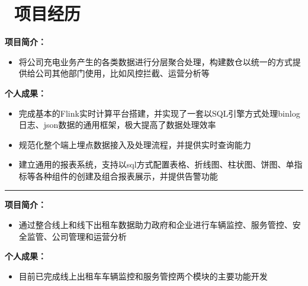 \documentclass{resume}
\begin{document}
\section{\faUsers\ 项目经历}
\textbf{项目简介：}
\begin{itemize}
  \item 将公司充电业务产生的各类数据进行分层聚合处理，构建数仓以统一的方式提供给公司其他部门使用，比如风控拦截、运营分析等
\end{itemize}
\textbf{个人成果：}
\begin{itemize}
  \item 完成基本的Flink实时计算平台搭建，并实现了一套以SQL引擎方式处理binlog日志、json数据的通用框架，极大提高了数据处理效率
  \item 规范化整个端上埋点数据接入及处理流程，并提供实时查询能力
  \item 建立通用的报表系统，支持以sql方式配置表格、折线图、柱状图、饼图、单指标等各种组件的创建及组合报表展示，并提供告警功能
\end{itemize}

\rule{\textwidth}{0.1mm}
\textbf{项目简介：}
\begin{itemize}
  \item 通过整合线上和线下出租车数据助力政府和企业进行车辆监控、服务管控、安全监管、公司管理和运营分析
\end{itemize}
\textbf{个人成果：}
\begin{itemize}
  \item 目前已完成线上出租车车辆监控和服务管控两个模块的主要功能开发
\end{itemize}
\end{document}
